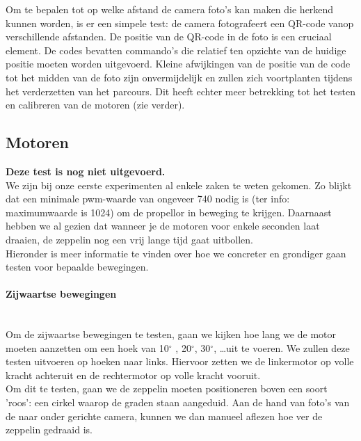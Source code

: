 \documentclass[tt]{penoverslag}
\begin{document}
Om te bepalen tot op welke afstand de camera foto's kan maken die herkend kunnen worden, is er een simpele test: de camera fotografeert een QR-code vanop verschillende afstanden. 
De positie van de QR-code in de foto is een cruciaal element. De codes bevatten commando’s die relatief ten opzichte van de huidige positie moeten worden uitgevoerd. Kleine afwijkingen van de positie van de code tot het midden van de foto zijn onvermijdelijk en zullen zich voortplanten tijdens het verderzetten van het parcours. Dit heeft echter meer betrekking tot het testen en calibreren van de motoren (zie verder). \\


\subsection{Motoren}
\textbf{Deze test is nog niet uitgevoerd.} \\

We zijn bij onze eerste experimenten al enkele zaken te weten gekomen. Zo blijkt dat een minimale pwm-waarde van ongeveer 740 nodig is (ter info: maximumwaarde is 1024) om de propellor in beweging te krijgen. Daarnaast hebben we al gezien dat wanneer je de motoren voor enkele seconden laat draaien, de zeppelin nog een vrij lange tijd gaat uitbollen. \\

Hieronder is meer informatie te vinden over hoe we concreter en grondiger gaan testen voor bepaalde bewegingen. \\

\paragraph{Zijwaartse bewegingen} ~\\ 
Om de zijwaartse bewegingen te testen, gaan we kijken hoe lang we de motor moeten aanzetten om een hoek van 10$^\circ$ , 20$^\circ$, 30$^\circ$, \ldots uit te voeren. We zullen deze testen uitvoeren op hoeken naar links. Hiervoor zetten we de linkermotor op volle kracht achteruit en de rechtermotor op volle kracht vooruit. \\

Om dit te testen, gaan we de zeppelin moeten positioneren boven een soort 'roos': een cirkel waarop de graden staan aangeduid. Aan de hand van foto's van de naar onder gerichte camera, kunnen we dan manueel aflezen hoe ver de zeppelin gedraaid is. \\
\end{document}
